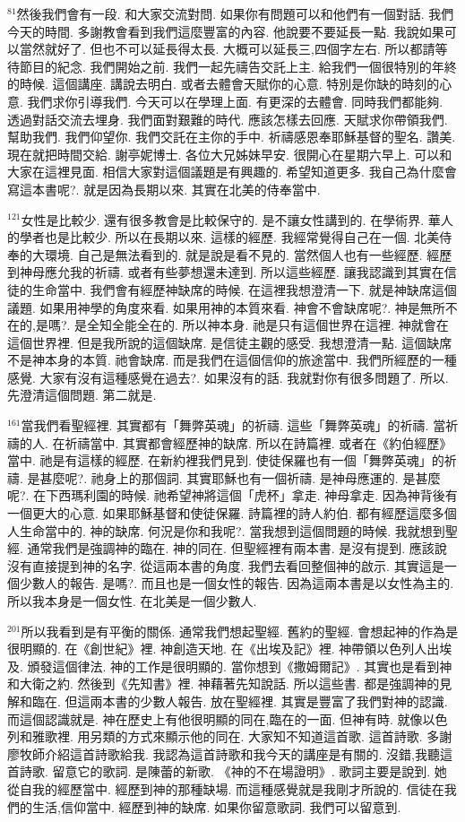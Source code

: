 \documentclass{book}
\begin{document}
$^{81}$然後我們會有一段.
和大家交流對問.
如果你有問題可以和他們有一個對話.
我們今天的時間.
多謝教會看到我們這麼豐富的內容.
他說要不要延長一點.
我說如果可以當然就好了.
但也不可以延長得太長.
大概可以延長三,四個字左右.
所以都請等待節目的紀念.
我們開始之前.
我們一起先禱告交託上主.
給我們一個很特別的年終的時候.
這個講座.
講說去明白.
或者去體會天賦你的心意.
特別是你缺的時刻的心意.
我們求你引導我們.
今天可以在學理上面.
有更深的去體會.
同時我們都能夠.
透過對話交流去埋身.
我們面對艱難的時代.
應該怎樣去回應.
天賦求你帶領我們.
幫助我們.
我們仰望你.
我們交託在主你的手中.
祈禱感恩奉耶穌基督的聖名.
讚美.
現在就把時間交給.
謝亭妮博士.
各位大兄姊妹早安.
很開心在星期六早上.
可以和大家在這裡見面.
相信大家對這個議題是有興趣的.
希望知道更多.
我自己為什麼會寫這本書呢?.
就是因為長期以來.
其實在北美的侍奉當中.

$^{121}$女性是比較少.
還有很多教會是比較保守的.
是不讓女性講到的.
在學術界.
華人的學者也是比較少.
所以在長期以來.
這樣的經歷.
我經常覺得自己在一個.
北美侍奉的大環境.
自己是無法看到的.
就是說是看不見的.
當然個人也有一些經歷.
經歷到神母應允我的祈禱.
或者有些夢想還未達到.
所以這些經歷.
讓我認識到其實在信徒的生命當中.
我們會有經歷神缺席的時候.
在這裡我想澄清一下.
就是神缺席這個議題.
如果用神學的角度來看.
如果用神的本質來看.
神會不會缺席呢?.
神是無所不在的,是嗎?.
是全知全能全在的.
所以神本身.
祂是只有這個世界在這裡.
神就會在這個世界裡.
但是我所說的這個缺席.
是信徒主觀的感受.
我想澄清一點.
這個缺席不是神本身的本質.
祂會缺席.
而是我們在這個信仰的旅途當中.
我們所經歷的一種感覺.
大家有沒有這種感覺在過去?.
如果沒有的話.
我就對你有很多問題了.
所以.
先澄清這個問題.
第二就是.

$^{161}$當我們看聖經裡.
其實都有「舞弊英魂」的祈禱.
這些「舞弊英魂」的祈禱.
當祈禱的人.
在祈禱當中.
其實都會經歷神的缺席.
所以在詩篇裡.
或者在《約伯經歷》當中.
祂是有這樣的經歷.
在新約裡我們見到.
使徒保羅也有一個「舞弊英魂」的祈禱.
是甚麼呢?.
祂身上的那個詞.
其實耶穌也有一個祈禱.
是神母應運的.
是甚麼呢?.
在下西瑪利園的時候.
祂希望神將這個「虎杯」拿走.
神母拿走.
因為神背後有一個更大的心意.
如果耶穌基督和使徒保羅.
詩篇裡的詩人約伯.
都有經歷這麼多個人生命當中的.
神的缺席.
何況是你和我呢?.
當我想到這個問題的時候.
我就想到聖經.
通常我們是強調神的臨在.
神的同在.
但聖經裡有兩本書.
是沒有提到.
應該說沒有直接提到神的名字.
從這兩本書的角度.
我們去看回整個神的啟示.
其實這是一個少數人的報告.
是嗎?.
而且也是一個女性的報告.
因為這兩本書是以女性為主的.
所以我本身是一個女性.
在北美是一個少數人.

$^{201}$所以我看到是有平衡的關係.
通常我們想起聖經.
舊約的聖經.
會想起神的作為是很明顯的.
在《創世紀》裡.
神創造天地.
在《出埃及記》裡.
神帶領以色列人出埃及.
頒發這個律法.
神的工作是很明顯的.
當你想到《撒姆爾記》.
其實也是看到神和大衛之約.
然後到《先知書》裡.
神藉著先知說話.
所以這些書.
都是強調神的見解和臨在.
但這兩本書的少數人報告.
放在聖經裡.
其實是豐富了我們對神的認識.
而這個認識就是.
神在歷史上有他很明顯的同在,臨在的一面.
但神有時.
就像以色列和雅歌裡.
用另類的方式來顯示他的同在.
大家知不知道這首歌.
這首詩歌.
多謝廖牧師介紹這首詩歌給我.
我認為這首詩歌和我今天的講座是有關的.
沒錯,我聽這首詩歌.
留意它的歌詞.
是陳蕾的新歌.
《神的不在場證明》.
歌詞主要是說到.
她從自我的經歷當中.
經歷到神的那種缺場.
而這種感覺就是我剛才所說的.
信徒在我們的生活,信仰當中.
經歷到神的缺席.
如果你留意歌詞.
我們可以留意到.
\end{document}
